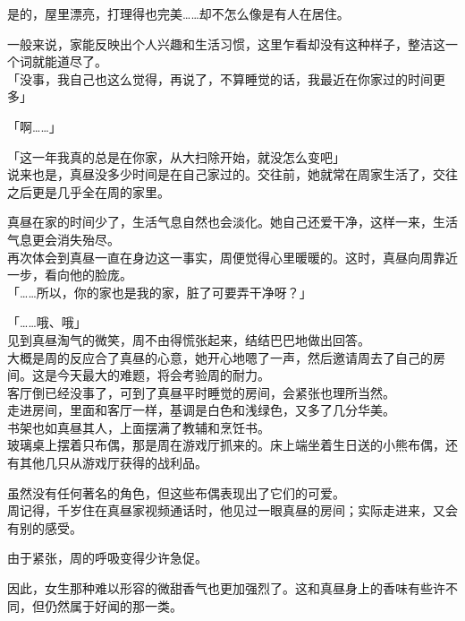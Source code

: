 是的，屋里漂亮，打理得也完美……却不怎么像是有人在居住。

一般来说，家能反映出个人兴趣和生活习惯，这里乍看却没有这种样子，整洁这一个词就能道尽了。\\

「没事，我自己也这么觉得，再说了，不算睡觉的话，我最近在你家过的时间更多」

「啊……」

「这一年我真的总是在你家，从大扫除开始，就没怎么变吧」\\

说来也是，真昼没多少时间是在自己家过的。交往前，她就常在周家生活了，交往之后更是几乎全在周的家里。

真昼在家的时间少了，生活气息自然也会淡化。她自己还爱干净，这样一来，生活气息更会消失殆尽。\\

再次体会到真昼一直在身边这一事实，周便觉得心里暖暖的。这时，真昼向周靠近一步，看向他的脸庞。\\

「……所以，你的家也是我的家，脏了可要弄干净呀？」

「……哦、哦」\\

见到真昼淘气的微笑，周不由得慌张起来，结结巴巴地做出回答。\\

大概是周的反应合了真昼的心意，她开心地嗯了一声，然后邀请周去了自己的房间。这是今天最大的难题，将会考验周的耐力。\\

客厅倒已经没事了，可到了真昼平时睡觉的房间，会紧张也理所当然。\\

走进房间，里面和客厅一样，基调是白色和浅绿色，又多了几分华美。\\

书架也如真昼其人，上面摆满了教辅和烹饪书。\\

玻璃桌上摆着只布偶，那是周在游戏厅抓来的。床上端坐着生日送的小熊布偶，还有其他几只从游戏厅获得的战利品。

虽然没有任何著名的角色，但这些布偶表现出了它们的可爱。\\

周记得，千岁住在真昼家视频通话时，他见过一眼真昼的房间；实际走进来，又会有别的感受。

由于紧张，周的呼吸变得少许急促。

因此，女生那种难以形容的微甜香气也更加强烈了。这和真昼身上的香味有些许不同，但仍然属于好闻的那一类。\\

